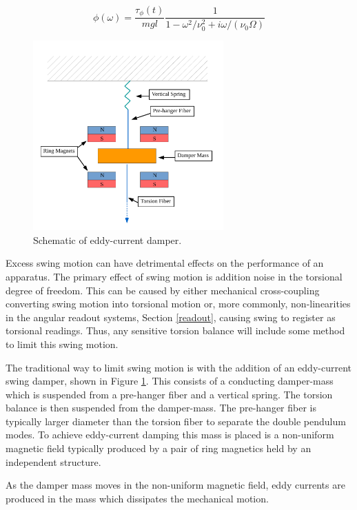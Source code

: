 \documentclass{book}
\begin{document}
\begin{equation}
\phi(\omega)=\frac{\tau_\phi(t)}{m g l} \frac{1}{1-\omega^2/\nu_0^2+i\omega/(\nu_0\Omega)}
\end{equation}


 \begin{figure}[!h]
\begin{centering}
\includegraphics[width=0.65\textwidth]{Damper.pdf}
\caption{Schematic of eddy-current damper.}\label{damper}
\end{centering}
\end{figure}

Excess swing motion can have detrimental effects on the performance of an apparatus. The primary effect of swing motion is addition noise in the torsional degree of freedom. This can be caused by either mechanical cross-coupling converting swing motion into torsional motion or, more commonly, non-linearities in the angular readout systems, Section \ref{readout}, causing swing to register as torsional readings. Thus, any sensitive torsion balance will include some method to limit this swing motion.

The traditional way to limit swing motion is with the addition of an eddy-current swing damper, shown in Figure \ref{damper}. This consists of a conducting damper-mass which is suspended from a pre-hanger fiber and a vertical spring. The torsion balance is then suspended from the damper-mass. The pre-hanger fiber is typically larger diameter than the torsion fiber to separate the double pendulum modes. To achieve eddy-current damping this mass is placed is a non-uniform magnetic field typically produced by a pair of ring magnetics held by an independent structure.

As the damper mass moves in the non-uniform magnetic field, eddy currents are produced in the mass which dissipates the mechanical motion. 
\end{document}
